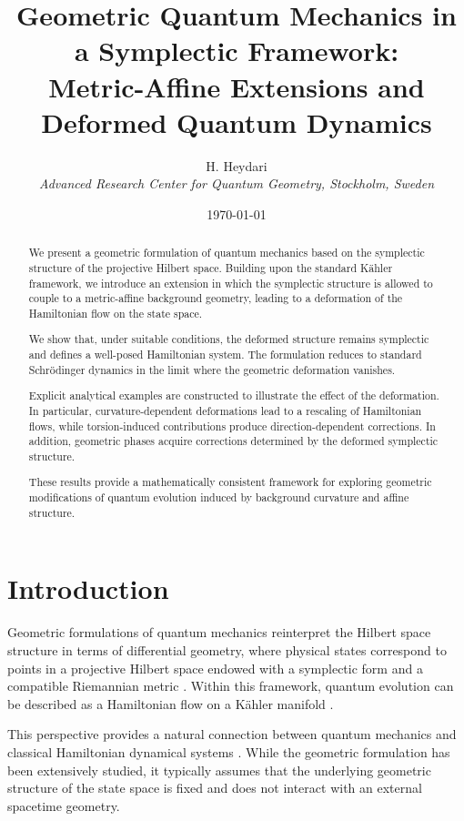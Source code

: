 \documentclass[11pt, a4paper]{article}
\title{
Geometric Quantum Mechanics in a Symplectic Framework:\\
Metric-Affine Extensions and Deformed Quantum Dynamics
}
\author{H. Heydari \\
\textit{Advanced Research Center for Quantum Geometry, Stockholm, Sweden}}
\date{\today}
\date{}
\begin{document}
\maketitle

\begin{abstract}
We present a geometric formulation of quantum mechanics based on the symplectic
structure of the projective Hilbert space. Building upon the standard
K\"ahler framework, we introduce an extension in which the symplectic
structure is allowed to couple to a metric-affine background geometry,
leading to a deformation of the Hamiltonian flow on the state space.

We show that, under suitable conditions, the deformed structure remains
symplectic and defines a well-posed Hamiltonian system. The formulation
reduces to standard Schr\"odinger dynamics in the limit where the geometric
deformation vanishes.

Explicit analytical examples are constructed to illustrate the effect of the
deformation. In particular, curvature-dependent deformations lead to a
rescaling of Hamiltonian flows, while torsion-induced contributions produce
direction-dependent corrections. In addition, geometric phases acquire
corrections determined by the deformed symplectic structure.

These results provide a mathematically consistent framework for exploring
geometric modifications of quantum evolution induced by background curvature
and affine structure.
\end{abstract}

\section{Introduction}

Geometric formulations of quantum mechanics reinterpret the Hilbert space
structure in terms of differential geometry, where physical states correspond
to points in a projective Hilbert space endowed with a symplectic form and a
compatible Riemannian metric \cite{kibble1979,ashtekar1999,brody2001}.
Within this framework, quantum evolution can be described as a Hamiltonian
flow on a K\"ahler manifold \cite{anandan1990,heydari2016}.

This perspective provides a natural connection between quantum mechanics
and classical Hamiltonian dynamical systems \cite{abraham1978,arnold1989}.
While the geometric formulation has been extensively studied, it typically
assumes that the underlying geometric structure of the state space is fixed
and does not interact with an external spacetime geometry.
\end{document}
